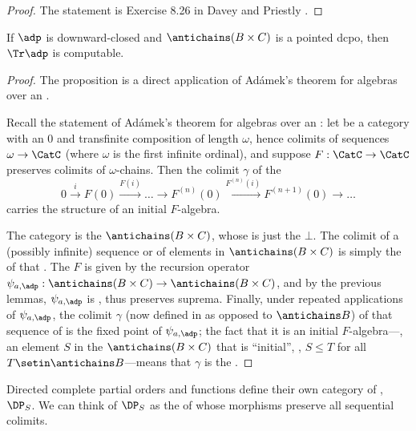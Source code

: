 \begin{proof}
    The statement is Exercise 8.26 in Davey and Priestly \citeXXX.
\end{proof}



\begin{proposition}\label{prop:pointed-dcpo}
    If $\adp$ is downward-closed and $\antichains (B \times C)$ is a pointed dcpo, then $\Tr \adp$ is computable.
\end{proposition}

\begin{proof}
    The proposition is a direct application of Ad\'amek's theorem for algebras over an .

    Recall the statement of Ad\'amek's theorem for algebras over an : let \CatC be a category with an  $0$ and transfinite composition of length $\omega$, hence colimits of sequences $\omega \to \CatC$ (where $\omega$ is the first infinite ordinal), and suppose $F: \CatC \to \CatC$ preserves colimits of $\omega$-chains.
    Then the colimit $\gamma$ of the  \begin{equation}
        0 \overset{i}{\to}
        F(0) \overset{F(i)}{\to} \ldots \to F^{(n)}(0) \overset{F^{(n)}(i)}{\to} F^{(n+1)}(0) \to \ldots
    \end{equation}
    carries the structure of an initial $F$-algebra.

    The category \CatC is the  $\antichains (B \times C)$, whose  is just the  $\bot$.
    The colimit of a (possibly infinite) sequence or  of elements in $\antichains (B\times C)$ is simply the  of that .
    The  $F$ is given by the recursion operator $\psi_{a,\adp} : \antichains (B\times C) \to \antichains (B\times C)$, and by the previous lemmas, $\psi_{a,\adp}$ is , thus preserves suprema.
    Finally, under repeated applications of $\psi_{a,\adp}$, the colimit $\gamma$ (now defined in \Pos as opposed to $\antichains B$) of that sequence of  is the fixed point of $\psi_{a,\adp}$; the fact that it is an initial $F$-algebra---\ie, an element $S$ in the  $\antichains (B\times C)$ that is ``initial'', \ie, $S \leq T$ for all $T \setin \antichains B$---means that $\gamma$ is the .
\end{proof}
Directed complete partial orders and  functions define their own category of , $\DP_S$.
We can think of $\DP_S$ as the  of \DP whose morphisms preserve all sequential colimits.

